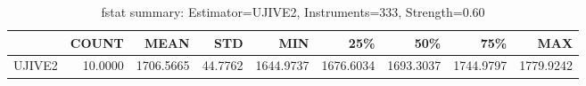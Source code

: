 \begin{table}[ht]
\centering
\caption{fstat summary: Estimator=UJIVE2, Instruments=333, Strength=0.60}
\begin{tabular}{lrrrrrrrr}
\toprule
 & COUNT & MEAN & STD & MIN & 25\% & 50\% & 75\% & MAX \\
\midrule
UJIVE2 & 10.0000 & 1706.5665 & 44.7762 & 1644.9737 & 1676.6034 & 1693.3037 & 1744.9797 & 1779.9242 \\
\bottomrule
\end{tabular}
\end{table}
